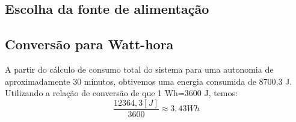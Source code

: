 \begin{table}[h!]
\centering
\renewcommand{\arraystretch}{1.3}
\caption{Cálculo da Energia Consumida (Autonomia de 30 minutos com valores de pico)}
\label{tab:energia_componentes_pico}
\end{table}

\subsection{Escolha da fonte de alimentação}
\subsection*{Conversão para Watt-hora}
A partir do cálculo de consumo total do sistema para uma autonomia de aproximadamente 30 minutos, obtivemos uma energia consumida de 8700,3 J. Utilizando a relação de conversão de que 1 Wh=3600 J, temos:
\[
    \frac{12364,3 [J]}{3600} \approx 3,43 Wh
\]
